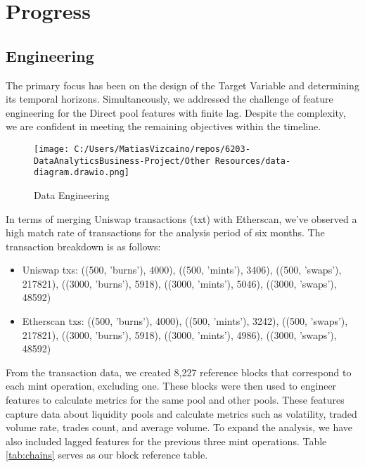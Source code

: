 \documentclass{article}
\begin{document}
{\section*{Progress}

\subsection*{Engineering}

The primary focus has been on the design of the Target Variable and determining its temporal horizons. Simultaneously, we addressed the challenge of feature engineering for the Direct pool features with finite lag. Despite the complexity, we are confident in meeting the remaining objectives within the timeline.
\begin{wrapfigure}[22]{r}{0.30\textwidth}
\vspace{-25pt} %
\centering
\texttt{[image: C:/Users/MatiasVizcaino/repos/6203-DataAnalyticsBusiness-Project/Other Resources/data-diagram.drawio.png]}
\caption{Data Engineering}
\label{fig:data-diagram}
\end{wrapfigure}

In terms of merging Uniswap transactions (txt) with Etherscan, we've observed a high match rate of transactions for the analysis period of six months. The transaction breakdown is as follows:

\begin{itemize}[leftmargin=*,noitemsep,nolistsep]
\small
\item Uniswap txs: ((500, 'burns'), 4000), ((500, 'mints'), 3406), ((500, 'swaps'), 217821), ((3000, 'burns'), 5918), ((3000, 'mints'), 5046), ((3000, 'swaps'), 48592)
\item Etherscan txs: ((500, 'burns'), 4000), ((500, 'mints'), 3242), ((500, 'swaps'), 217821), ((3000, 'burns'), 5918), ((3000, 'mints'), 4986), ((3000, 'swaps'), 48592)
\end{itemize}

From the transaction data, we created 8,227 reference blocks that correspond to each mint operation, excluding one. These blocks were then used to engineer features to calculate metrics for the same pool and other pools. These features capture data about liquidity pools and calculate metrics such as volatility, traded volume rate, trades count, and average volume. To expand the analysis, we have also included lagged features for the previous three mint operations. Table \ref{tab:chains} serves as our block reference table.

}
\end{document}
